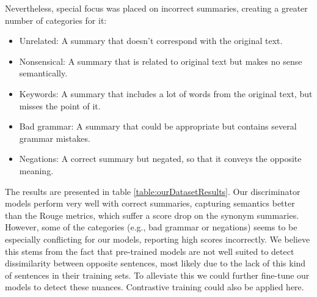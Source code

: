 \documentclass[11pt]{article}
\begin{document}
Nevertheless, special focus was placed on incorrect summaries, creating a greater number of categories for it:

\begin{itemize}
    \item Unrelated: A summary that doesn't correspond with the original text.
    \item Nonsensical: A summary that is related to original text but makes no sense semantically.
    \item Keywords: A summary that includes a lot of words from the original text, but misses the point of it.
    \item Bad grammar: A summary that could be appropriate but contains several grammar mistakes.
    \item Negations: A correct summary but negated, so that it conveys the opposite meaning.
\end{itemize}

The results are presented in table \ref{table:ourDatasetResults}. Our discriminator models perform very well with correct summaries, capturing semantics better than the Rouge metrics, which suffer a score drop on the synonym summaries. However, some of the categories (e.g., bad grammar or negations) seems to be especially conflicting for our models, reporting high scores incorrectly. We believe this stems from the fact that pre-trained models are not well suited to detect dissimilarity between opposite sentences, most likely due to the lack of this kind of sentences in their training sets. To alleviate this we could further fine-tune our models to detect these nuances. Contrastive training could also be applied here.
\end{document}
